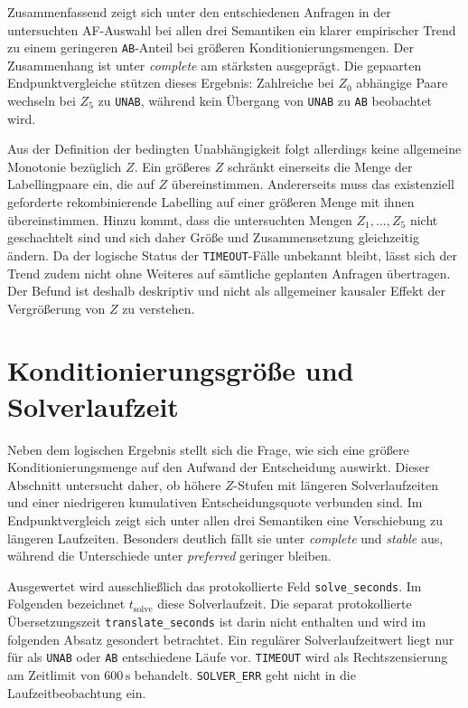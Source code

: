 Zusammenfassend zeigt sich unter den entschiedenen Anfragen in der
untersuchten AF-Auswahl bei allen drei Semantiken ein klarer empirischer Trend
zu einem geringeren \texttt{AB}-Anteil bei größeren Konditionierungsmengen.
Der Zusammenhang ist unter \emph{complete} am stärksten ausgeprägt. Die
gepaarten Endpunktvergleiche stützen dieses Ergebnis: Zahlreiche bei \(Z_0\)
abhängige Paare wechseln bei \(Z_5\) zu \texttt{UNAB}, während kein Übergang
von \texttt{UNAB} zu \texttt{AB} beobachtet wird.

Aus der Definition der bedingten Unabhängigkeit folgt allerdings keine
allgemeine Monotonie bezüglich \(Z\). Ein größeres \(Z\) schränkt einerseits
die Menge der Labellingpaare ein, die auf \(Z\) übereinstimmen. Andererseits
muss das existenziell geforderte rekombinierende Labelling auf einer größeren
Menge mit ihnen übereinstimmen. Hinzu kommt, dass die untersuchten Mengen
\(Z_1,\ldots,Z_5\) nicht geschachtelt sind und sich daher Größe und
Zusammensetzung gleichzeitig ändern. Da der logische Status der
\texttt{TIMEOUT}-Fälle unbekannt bleibt, lässt sich der Trend zudem nicht ohne
Weiteres auf sämtliche geplanten Anfragen übertragen. Der Befund ist deshalb
deskriptiv und nicht als allgemeiner kausaler Effekt der Vergrößerung von
\(Z\) zu verstehen.

\section{Konditionierungsgröße und Solverlaufzeit}
\label{subsec:z-runtime}

Neben dem logischen Ergebnis stellt sich die Frage, wie sich eine 
größere Konditionierungsmenge auf den Aufwand der Entscheidung auswirkt. 
Dieser Abschnitt untersucht daher, ob höhere \(Z\)-Stufen mit längeren 
Solverlaufzeiten und einer niedrigeren kumulativen Entscheidungsquote verbunden 
sind. Im Endpunktvergleich zeigt sich unter allen drei Semantiken eine 
Verschiebung zu längeren Laufzeiten. Besonders deutlich fällt sie 
unter \emph{complete} und \emph{stable} aus, 
während die Unterschiede unter \emph{preferred} geringer bleiben.

Ausgewertet wird ausschließlich das protokollierte Feld
\texttt{solve\_\allowbreak seconds}. Im Folgenden bezeichnet
\(t_{\mathrm{solve}}\) diese Solverlaufzeit. Die separat protokollierte
Übersetzungszeit \texttt{translate\_\allowbreak seconds} ist darin nicht
enthalten und wird im folgenden Absatz gesondert betrachtet. Ein regulärer
Solverlaufzeitwert liegt nur für als \texttt{UNAB} oder \texttt{AB}
entschiedene Läufe vor. \texttt{TIMEOUT} wird als Rechtszensierung am Zeitlimit
von \(600\,\mathrm{s}\) behandelt. \texttt{SOLVER\_ERR} geht nicht in die
Laufzeitbeobachtung ein.

